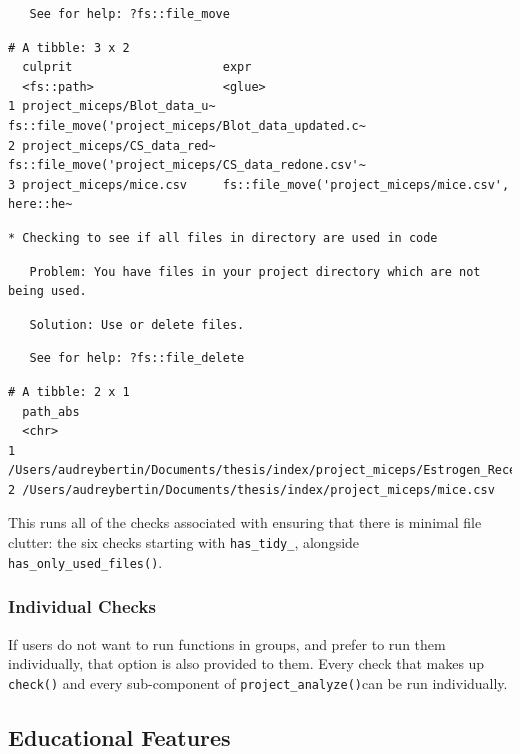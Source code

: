\documentclass[12pt,twoside]{reedthesis}
\begin{document}
\begin{verbatim}
   See for help: ?fs::file_move
\end{verbatim}
\begin{verbatim}
# A tibble: 3 x 2
  culprit                     expr                                              
  <fs::path>                  <glue>                                            
1 project_miceps/Blot_data_u~ fs::file_move('project_miceps/Blot_data_updated.c~
2 project_miceps/CS_data_red~ fs::file_move('project_miceps/CS_data_redone.csv'~
3 project_miceps/mice.csv     fs::file_move('project_miceps/mice.csv', here::he~
\end{verbatim}
\begin{verbatim}
* Checking to see if all files in directory are used in code
\end{verbatim}
\begin{verbatim}
   Problem: You have files in your project directory which are not being used.
\end{verbatim}
\begin{verbatim}
   Solution: Use or delete files.
\end{verbatim}
\begin{verbatim}
   See for help: ?fs::file_delete
\end{verbatim}
\begin{verbatim}
# A tibble: 2 x 1
  path_abs                                                                      
  <chr>                                                                         
1 /Users/audreybertin/Documents/thesis/index/project_miceps/Estrogen_Receptors.~
2 /Users/audreybertin/Documents/thesis/index/project_miceps/mice.csv            
\end{verbatim}
This runs all of the checks associated with ensuring that there is minimal file clutter: the six checks starting with \texttt{has\_tidy\_}, alongside \texttt{has\_only\_used\_files()}.

\hypertarget{individual-checks}{%
\subsubsection{Individual Checks}\label{individual-checks}}

If users do not want to run functions in groups, and prefer to run them individually, that option is also provided to them. Every check that makes up \texttt{check()} and every sub-component of \texttt{project\_analyze()}can be run individually.

\hypertarget{educational-features}{%
\subsection{Educational Features}\label{educational-features}}
\end{document}
